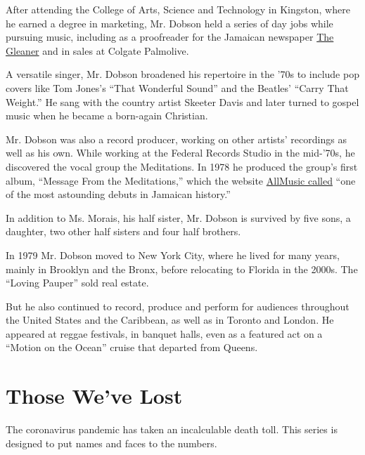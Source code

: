 After attending the College of Arts, Science and Technology in Kingston,
where he earned a degree in marketing, Mr. Dobson held a series of day
jobs while pursuing music, including as a proofreader for the Jamaican
newspaper \href{http://jamaica-gleaner.com/}{The Gleaner} and in sales
at Colgate Palmolive.

A versatile singer, Mr. Dobson broadened his repertoire in the '70s to
include pop covers like Tom Jones's ``That Wonderful Sound'' and the
Beatles' ``Carry That Weight.'' He sang with the country artist Skeeter
Davis and later turned to gospel music when he became a born-again
Christian.

Mr. Dobson was also a record producer, working on other artists'
recordings as well as his own. While working at the Federal Records
Studio in the mid-'70s, he discovered the vocal group the Meditations.
In 1978 he produced the group's first album, ``Message From the
Meditations,'' which the website
\href{https://www.allmusic.com/album/message-from-the-meditations-mw0000925754}{AllMusic
called} ``one of the most astounding debuts in Jamaican history.''

In addition to Ms. Morais, his half sister, Mr. Dobson is survived by
five sons, a daughter, two other half sisters and four half brothers.

In 1979 Mr. Dobson moved to New York City, where he lived for many
years, mainly in Brooklyn and the Bronx, before relocating to Florida in
the 2000s. The ``Loving Pauper'' sold real estate.

But he also continued to record, produce and perform for audiences
throughout the United States and the Caribbean, as well as in Toronto
and London. He appeared at reggae festivals, in banquet halls, even as a
featured act on a ``Motion on the Ocean'' cruise that departed from
Queens.

\href{https://www.nytimes.com/interactive/2020/obituaries/people-died-coronavirus-obituaries.html?action=click\&pgtype=Article\&state=default\&region=BELOW_MAIN_CONTENT\&context=covid_obits_promo}{}

\hypertarget{those-weve-lost}{%
\section{Those We've Lost}\label{those-weve-lost}}

The coronavirus pandemic has taken an incalculable death toll. This
series is designed to put names and faces to the numbers.

